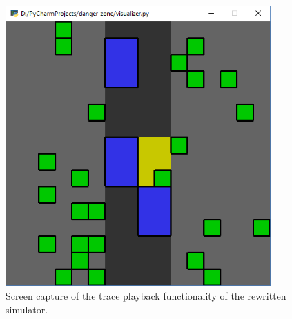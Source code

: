 \begin{figure}[b]
    \centering
    \includegraphics[width=4in]{images/screenshot-discrete.png}
    \caption{Screen capture of the trace playback functionality of the rewritten simulator.}
    \label{fig:screenshot-discrete}
\end{figure}
